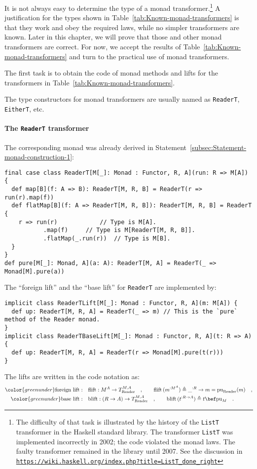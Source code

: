 It is not always easy to determine the type of a monad transformer.\footnote{The difficulty of that task is illustrated by the history of the \lstinline!ListT!
transformer in the Haskell standard library. The transformer \lstinline!ListT!
was implemented incorrectly in 2002; the code violated the monad laws.
The faulty transformer remained in the library until 2007. See the
discussion in \texttt{\href{https://wiki.haskell.org/index.php?title=ListT_done_right}{https://wiki.haskell.org/index.php?title=ListT\_done\_right}}} A justification for the types shown in Table~\ref{tab:Known-monad-transformers}
is that they work and obey the required laws, while no simpler transformers
are known. Later in this chapter, we will prove that those and other
monad transformers are correct. For now, we accept the results of
Table~\ref{tab:Known-monad-transformers} and turn to the practical
use of monad transformers. 

The first task is to obtain the code of monad methods and lifts for
the transformers in Table~\ref{tab:Known-monad-transformers}.

The type constructors for monad transformers are usually named as
\lstinline!ReaderT!, \lstinline!EitherT!, etc. 

\paragraph{The \texttt{ReaderT} transformer}

The corresponding monad was already derived in Statement~\ref{subsec:Statement-monad-construction-1}:
\begin{lstlisting}
final case class ReaderT[M[_]: Monad : Functor, R, A](run: R => M[A]) {
  def map[B](f: A => B): ReaderT[M, R, B] = ReaderT(r => run(r).map(f))
  def flatMap[B](f: A => ReaderT[M, R, B]): ReaderT[M, R, B] = ReaderT {
    r => run(r)            // Type is M[A].
           .map(f)     // Type is M[ReaderT[M, R, B]].
           .flatMap(_.run(r))  // Type is M[B].
  }
}
def pure[M[_]: Monad, A](a: A): ReaderT[M, A] = ReaderT(_ => Monad[M].pure(a))
\end{lstlisting}
The \textsf{``}foreign lift\textsf{''} and the \textsf{``}base lift\textsf{''} for \lstinline!ReaderT!
are implemented by:
\begin{lstlisting}
implicit class ReaderTLift[M[_]: Monad : Functor, R, A](m: M[A]) {
  def up: ReaderT[M, R, A] = ReaderT(_ => m) // This is the `pure` method of the Reader monad.
}
implicit class ReaderTBaseLift[M[_]: Monad : Functor, R, A](t: R => A) {
  def up: ReaderT[M, R, A] = ReaderT(r => Monad[M].pure(t(r)))
}
\end{lstlisting}
The lifts are written in the code notation as:
\begin{align*}
{\color{greenunder}\text{foreign lift}:}\quad & \text{flift}:M^{A}\rightarrow T_{\text{Reader}}^{M,A}\quad,\quad\quad\text{flift}\,(m^{:M^{A}})\triangleq\_^{:R}\rightarrow m=\text{pu}_{\text{Reader}}(m)\quad,\\
{\color{greenunder}\text{base lift}:}\quad & \text{blift}:(R\rightarrow A)\rightarrow T_{\text{Reader}}^{M,A}\quad,\quad\quad\text{blift}\,(t^{:R\rightarrow A})\triangleq t\bef\text{pu}_{M}\quad.
\end{align*}

